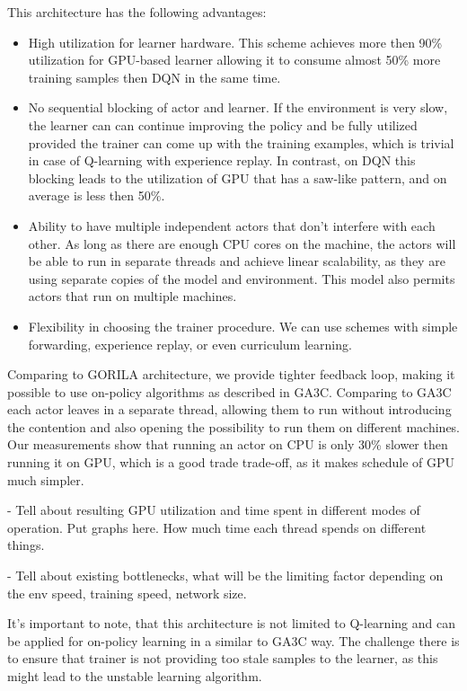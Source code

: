 This architecture has the following advantages:
\begin{itemize}
    \item High utilization for learner hardware. This scheme achieves more then 90\% utilization
        for GPU-based learner allowing it to consume almost 50\% more training samples then DQN in
        the same time.

    \item No sequential blocking of actor and learner. If the environment is very slow, the learner
        can can continue improving the policy and be fully utilized provided the trainer can come up
        with the training examples, which is trivial in case of Q-learning with experience replay.
        In contrast, on DQN this blocking leads to the utilization of GPU that has a saw-like
        pattern, and on average is less then 50\%.

    \item Ability to have multiple independent actors that don't interfere with each other. As long
        as there are enough CPU cores on the machine, the actors will be able to run in separate
        threads and achieve linear scalability, as they are using separate copies of the model and
        environment. This model also permits actors that run on multiple machines.

    \item Flexibility in choosing the trainer procedure. We can use schemes with simple forwarding,
        experience replay, or even curriculum learning.
\end{itemize}

Comparing to GORILA architecture, we provide tighter feedback loop, making it possible to use
on-policy algorithms as described in GA3C. Comparing to GA3C each actor leaves in a separate
thread, allowing them to run without introducing the contention and also opening the possibility
to run them on different machines. Our measurements show that running an actor on CPU is only 30\%
slower then running it on GPU, which is a good trade trade-off, as it makes schedule of GPU much
simpler.

- Tell about resulting GPU utilization and time spent in different modes of operation.
Put graphs here. How much time each thread spends on different things.

- Tell about existing bottlenecks, what will be the limiting factor depending on the env speed,
training speed, network size.

It's important to note, that this architecture is not limited to Q-learning and can be applied
for on-policy learning in a similar to GA3C way. The challenge there is to ensure that trainer is
not providing too stale samples to the learner, as this might lead to the unstable learning
algorithm.
